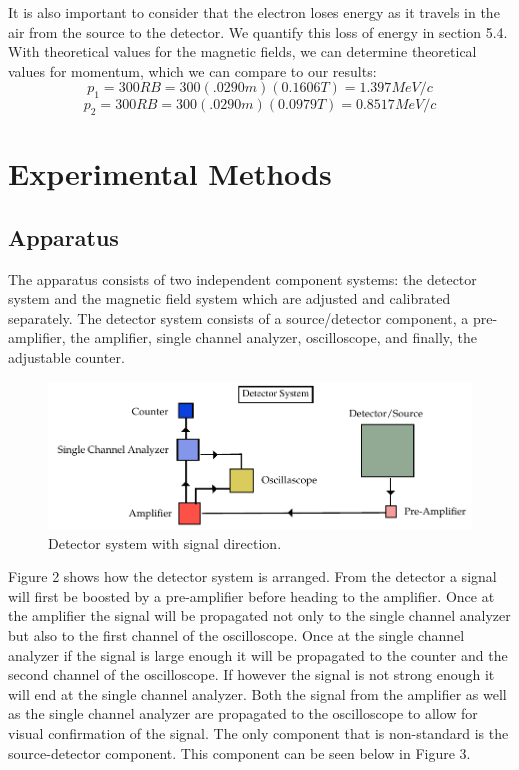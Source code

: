 It is also important to consider  that the electron loses energy as it travels in the air from the source to the detector. We quantify this loss of energy in section 5.4. With theoretical values for the magnetic fields, we can determine theoretical values for momentum, which we can compare to our results:
\begin{equation}p_1=300RB=300(.0290m)(0.1606T)=1.397 MeV/c\end{equation}
\begin{equation}p_2=300RB=300(.0290m)(0.0979T)=0.8517 MeV/c\end{equation}

\section{Experimental Methods}
\subsection{Apparatus}
The apparatus consists of two independent component systems: the detector system and the magnetic field system which are adjusted and calibrated separately.  The detector system consists of a source/detector component, a pre-amplifier, the amplifier, single channel analyzer, oscilloscope, and finally, the adjustable counter.

\begin{figure}[H]
\begin{center}
\includegraphics[width=4 in]{REM-figures.pdf}
\caption{Detector system with signal direction.}
\end{center}
\end{figure}

Figure 2 shows how the detector system is arranged.  From the detector a signal will first be boosted by a pre-amplifier before heading to the amplifier. Once at the amplifier the signal will be propagated not only to the single channel analyzer but also to the first channel of the  oscilloscope.  Once at the single channel analyzer if the signal is large enough it will be propagated to the counter and the second channel of the oscilloscope. If however the signal is not strong enough it will end at the single channel analyzer. Both the signal from the amplifier as well as the single channel analyzer are propagated to the oscilloscope to allow for visual confirmation of the signal.  
The only component that is non-standard is the source-detector component.  This component can be seen below in Figure 3.
 
